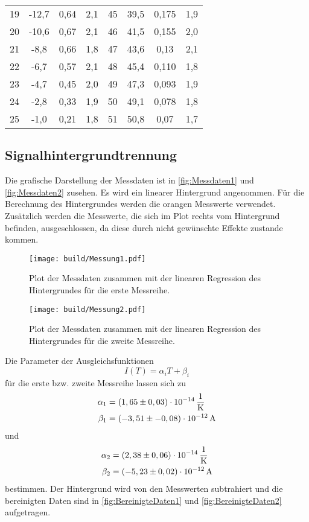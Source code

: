 \begin{table}[H]
\begin{tabular}{c c c c c c c c}
        19  &-12,7   &0,64    & 2,1&45  &39,5   & 0,175 & 1,9 \\
        20  &-10,6   &0,67    & 2,1&46  &41,5   & 0,155 & 2,0 \\
        21  &-8,8    &0,66    & 1,8&47  &43,6   & 0,13  & 2,1\\
        22  &-6,7    &0,57    & 2,1&48  &45,4   & 0,110 & 1,8 \\
        23  &-4,7    &0,45    & 2,0&49  &47,3   & 0,093 & 1,9 \\
        24  &-2,8    &0,33    & 1,9&50  &49,1   & 0,078 & 1,8 \\
        25  &-1,0    &0,21    & 1,8&51  &50,8   & 0,07  & 1,7\\
        \bottomrule
        \end{tabular}
        \end{table}
  
  

\subsection{Signalhintergrundtrennung}
\label{sec:Signalhintergrundtrennung}
        
Die grafische Darstellung der Messdaten ist in \autoref{fig:Messdaten1} und \autoref{fig:Messdaten2} zusehen.
Es wird ein linearer Hintergrund angenommen. Für die Berechnung des Hintergrundes werden die orangen Messwerte verwendet.
Zusätzlich werden die Messwerte, die sich im Plot rechts vom Hintergrund befinden, ausgeschlossen, da diese durch nicht gewünschte Effekte zustande kommen. 
\begin{figure}[H]
    \centering
    \texttt{[image: build/Messung1.pdf]}
    \caption{Plot der Messdaten zusammen mit der linearen Regression des Hintergrundes für die erste Messreihe.}
    \label{fig:Messdaten1}
\end{figure}
\begin{figure}[H]
    \centering
    \texttt{[image: build/Messung2.pdf]}
    \caption{Plot der Messdaten zusammen mit der linearen Regression des Hintergrundes für die zweite Messreihe.}
    \label{fig:Messdaten2}
\end{figure}
Die Parameter der Ausgleichsfunktionen
\begin{equation*}
    I\left(T\right) = \alpha_i T + \beta_i
\end{equation*}
für die erste bzw. zweite Messreihe lassen sich zu 
\begin{align*}
    \alpha_1 &=         (1,65 \pm 0,03 ) \cdot 10^{-14} \,\unit{\dfrac{1}{\kelvin}} \\
    \beta_1  &=         (-3,51 \pm-0,08) \cdot 10^{-12} \,\unit{\ampere} 
\end{align*}
und 
\begin{align*}
    \alpha_2 &=         ( 2,38 \pm 0,06 ) \cdot 10^{-14}  \,\unit{\dfrac{1}{\kelvin}} \\
    \beta_2  &=         (-5,23 \pm 0,02 ) \cdot 10^{-12} \,\unit{\ampere} 
\end{align*}
bestimmen.
Der Hintergrund wird von den Messwerten subtrahiert und die bereinigten Daten sind in 
\autoref{fig:BereinigteDaten1} und \autoref{fig:BereinigteDaten2} aufgetragen.

